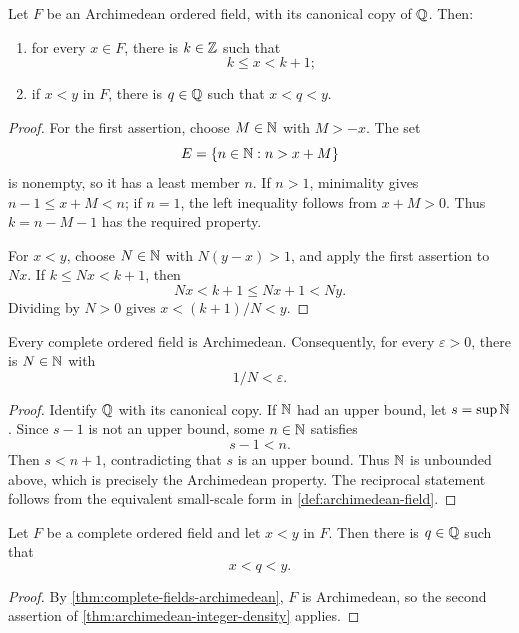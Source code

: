 \begin{theorem}
\label{thm:archimedean-integer-density}
Let \(F\) be an Archimedean ordered field, with its canonical copy of
\(\mathbb{Q}\). Then:
\begin{enumerate}
\item for every \(x\in F\), there is \(k\in\mathbb{Z}\) such that
\[
k\leq x<k+1;
\]
\item if \(x<y\) in \(F\), there is \(q\in\mathbb{Q}\) such that \(x<q<y\).
\end{enumerate}
\end{theorem}
\begin{proof}
For the first assertion, choose \(M\in\mathbb{N}\) with \(M>-x\). The set
\[
E=\{n\in\mathbb{N}:n>x+M\}
\]
is nonempty, so it has a least member \(n\). If \(n>1\), minimality gives
\(n-1\leq x+M<n\); if \(n=1\), the left inequality follows from
\(x+M>0\). Thus \(k=n-M-1\) has the required property.

For \(x<y\), choose \(N\in\mathbb{N}\) with \(N(y-x)>1\), and apply the first
assertion to \(Nx\). If \(k\leq Nx<k+1\), then
\[
Nx<k+1\leq Nx+1<Ny.
\]
Dividing by \(N>0\) gives \(x<(k+1)/N<y\).
\end{proof}

\begin{theorem}
\label{thm:complete-fields-archimedean}
Every complete ordered field is Archimedean. Consequently, for every
\(\varepsilon>0\), there is \(N\in\mathbb{N}\) with
\[
1/N<\varepsilon.
\]

\end{theorem}
\begin{proof}
Identify \(\mathbb{Q}\) with its canonical copy.  If \(\mathbb{N}\) had an upper bound, let
\(s=\sup\mathbb{N}\).  Since \(s-1\) is not an upper bound, some \(n\in\mathbb{N}\) satisfies
\[
s-1<n.
\]
Then \(s<n+1\), contradicting that \(s\) is an upper bound.  Thus \(\mathbb{N}\) is
unbounded above, which is precisely the Archimedean property. The reciprocal
statement follows from the equivalent small-scale form in
\cref{def:archimedean-field}.
\end{proof}

\begin{theorem}
\label{thm:complete-field-rational-density}
Let \(F\) be a complete ordered field and let \(x<y\) in \(F\).  Then there
is \(q\in\mathbb{Q}\) such that
\[
x<q<y.
\]
\end{theorem}
\begin{proof}
By \cref{thm:complete-fields-archimedean}, \(F\) is Archimedean, so the
second assertion of \cref{thm:archimedean-integer-density} applies.
\end{proof}

